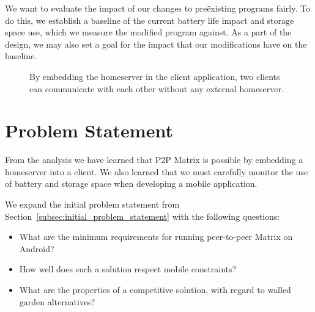 We want to evaluate the impact of our changes to preëxisting programs fairly.
To do this, we establish a baseline of the current battery life impact and storage space use, which we measure the modified program against.
As a part of the design, we may also set a goal for the impact that our modifications have on the baseline.

\begin{figure}
	\centering
	\resizebox{!}{!}{}
	\caption{
		By embedding the homeserver in the client application, two clients can communicate with each other without any external homeserver.
	}%
	\label{fig:p2p-embed}
\end{figure}

\section{Problem Statement}\label{sec:problem_statement}

From the analysis we have learned that \ac{P2P} Matrix is possible by embedding a homeserver into a client.
We also learned that we must carefully monitor the use of battery and storage space when developing a mobile application.

We expand the initial problem statement from Section~\ref{subsec:initial_problem_statement} with the following questions:\\
\begin{itemize}
	\item What are the minimum requirements for running peer-to-peer Matrix on Android?
	\item How well does such a solution respect mobile constraints?
	\item What are the properties of a competitive solution, with regard to walled garden alternatives?
\end{itemize}